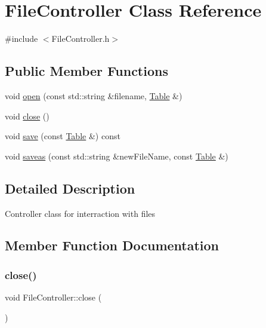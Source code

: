 \hypertarget{classFileController}{}\section{File\+Controller Class Reference}
\label{classFileController}


{\ttfamily \#include $<$File\+Controller.\+h$>$}

\subsection*{Public Member Functions}
\begin{DoxyCompactItemize}
\item 
void \hyperlink{classFileController_a3e559be5fba16c52aba8e82eea63c654}{open} (const std\+::string \&filename, \hyperlink{classTable}{Table} \&)
\item 
void \hyperlink{classFileController_a769aa819f60cc6f1557868008b781c3c}{close} ()
\item 
void \hyperlink{classFileController_a9ed5c3b640ad19438a660e1c7a201695}{save} (const \hyperlink{classTable}{Table} \&) const
\item 
void \hyperlink{classFileController_af258e978bb75dd280187a7ee3b2c64ae}{saveas} (const std\+::string \&new\+File\+Name, const \hyperlink{classTable}{Table} \&)
\end{DoxyCompactItemize}


\subsection{Detailed Description}
Controller class for interraction with files 

\subsection{Member Function Documentation}
\mbox{\label{classFileController_a769aa819f60cc6f1557868008b781c3c}} 
\subsubsection{\texorpdfstring{close()}{close()}}
{\footnotesize\ttfamily void File\+Controller\+::close (\begin{DoxyParamCaption}{ }\end{DoxyParamCaption})}

